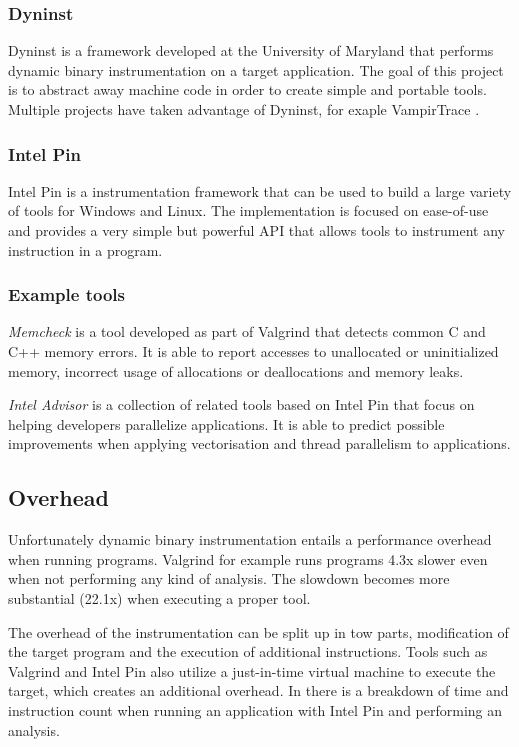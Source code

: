 \subsubsection{Dyninst}

Dyninst \cite{dyninst} is a framework developed at the University of Maryland that performs dynamic binary instrumentation on a target application. The goal of this project is to abstract away machine code in order to create simple and portable tools. Multiple projects have taken advantage of Dyninst, for exaple VampirTrace \cite{vampirtrace}.

\subsubsection{Intel Pin}

Intel Pin \cite{pin} is a instrumentation framework that can be used to build a large variety of tools for Windows and Linux. The implementation is focused on ease-of-use and provides a very simple but powerful API that allows tools to instrument any instruction in a program.

\subsubsection{Example tools}

\emph{Memcheck} \cite{memcheck} is a tool developed as part of Valgrind that detects common C and C++ memory errors. It is able to report accesses to unallocated or uninitialized memory, incorrect usage of allocations or deallocations and memory leaks.

\emph{Intel Advisor} \cite{inteladvisor} is a collection of related tools based on Intel Pin that focus on helping developers parallelize applications. It is able to predict possible improvements when applying vectorisation and thread parallelism to applications.

\subsection{Overhead}

Unfortunately dynamic binary instrumentation entails a performance overhead when running programs. Valgrind for example runs programs 4.3x slower \cite{valgrind} even when not performing any kind of analysis. The slowdown becomes more substantial (22.1x) when executing a proper tool.

The overhead of the instrumentation can be split up in tow parts, modification of the target program and the execution of additional instructions. Tools such as Valgrind and Intel Pin also utilize a just-in-time virtual machine to execute the target, which creates an additional overhead. In \cite{instoverhead} there is a breakdown of time and instruction count when running an application with Intel Pin and performing an analysis.

